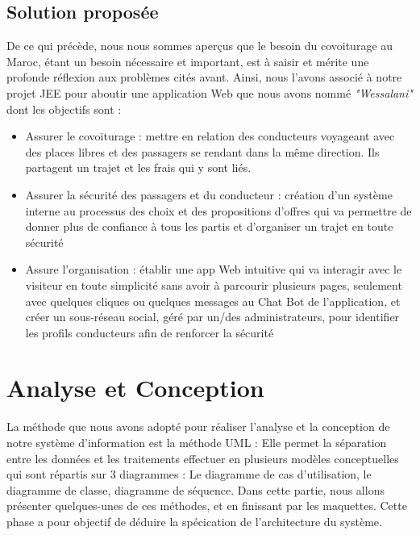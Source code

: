 \documentclass[a4paper]{report}
\begin{document}
\begin{spacing}{2}
\section{Solution proposée}

De ce qui précède, nous nous sommes aperçus que le besoin du covoiturage au Maroc, étant un besoin nécessaire et important, est à saisir et mérite une profonde réflexion aux problèmes cités avant. Ainsi, nous l'avons associé à notre projet JEE pour aboutir une application Web que nous avons nommé \textit{"Wessalani"} dont les objectifs sont :


\begin{itemize}
\item Assurer le covoiturage : mettre en relation des conducteurs voyageant avec des places libres et des passagers se rendant dans la même direction. Ils partagent un trajet et les frais qui y sont liés.
\item Assurer la sécurité des passagers et du conducteur : création d'un système interne au processus des choix et des propositions d'offres qui va permettre de donner plus de confiance à tous les partis et d'organiser un trajet en toute sécurité 
\item Assure l'organisation : établir une app Web intuitive qui va interagir avec le visiteur en toute simplicité sans avoir à parcourir plusieurs pages, seulement avec quelques cliques ou quelques messages au Chat Bot de l'application, et créer un sous-réseau social, géré par un/des administrateurs,
pour identifier les profils conducteurs afin de renforcer la sécurité 
\end{itemize}


\chapter{Analyse et Conception}

\par
La méthode que nous avons adopté pour réaliser l'analyse et la conception de
notre système d'information est la méthode UML : Elle permet la séparation
entre les données et les traitements effectuer en plusieurs modèles conceptuelles
qui sont répartis sur 3 diagrammes : Le diagramme de cas d’utilisation, le 
diagramme de classe, diagramme de séquence. Dans cette partie, nous allons 
présenter quelques-unes de ces méthodes, et en finissant par les maquettes.
Cette phase a pour objectif de déduire la spécication de l'architecture du système.














\end{spacing}
\end{document}
